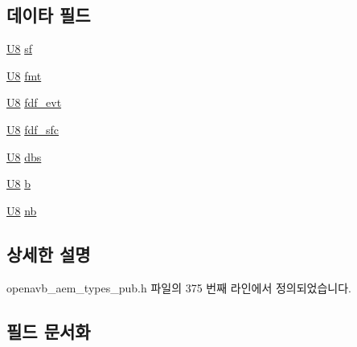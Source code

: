 \subsection*{데이타 필드}
\begin{DoxyCompactItemize}
\item 
\hyperlink{openavb__types__base__pub_8h_aa63ef7b996d5487ce35a5a66601f3e73}{U8} \hyperlink{structopenavb__aem__stream__format__iec__61883__6__32bit__t_a153db177c2b7653917dff143e5f755e1}{sf}
\item 
\hyperlink{openavb__types__base__pub_8h_aa63ef7b996d5487ce35a5a66601f3e73}{U8} \hyperlink{structopenavb__aem__stream__format__iec__61883__6__32bit__t_ab88030d1822b822615cede2168f1c31e}{fmt}
\item 
\hyperlink{openavb__types__base__pub_8h_aa63ef7b996d5487ce35a5a66601f3e73}{U8} \hyperlink{structopenavb__aem__stream__format__iec__61883__6__32bit__t_a5face0fe6e253b8041386eaa28f73800}{fdf\+\_\+evt}
\item 
\hyperlink{openavb__types__base__pub_8h_aa63ef7b996d5487ce35a5a66601f3e73}{U8} \hyperlink{structopenavb__aem__stream__format__iec__61883__6__32bit__t_a637053a40379dcc42801b92779cd870e}{fdf\+\_\+sfc}
\item 
\hyperlink{openavb__types__base__pub_8h_aa63ef7b996d5487ce35a5a66601f3e73}{U8} \hyperlink{structopenavb__aem__stream__format__iec__61883__6__32bit__t_abed3ffe3c3261fb920ef333f76a290bd}{dbs}
\item 
\hyperlink{openavb__types__base__pub_8h_aa63ef7b996d5487ce35a5a66601f3e73}{U8} \hyperlink{structopenavb__aem__stream__format__iec__61883__6__32bit__t_a8921ab436782828cd4262390e8b01eb7}{b}
\item 
\hyperlink{openavb__types__base__pub_8h_aa63ef7b996d5487ce35a5a66601f3e73}{U8} \hyperlink{structopenavb__aem__stream__format__iec__61883__6__32bit__t_a023f12d5e389074b0205b2ff18a0db54}{nb}
\end{DoxyCompactItemize}


\subsection{상세한 설명}


openavb\+\_\+aem\+\_\+types\+\_\+pub.\+h 파일의 375 번째 라인에서 정의되었습니다.



\subsection{필드 문서화}
